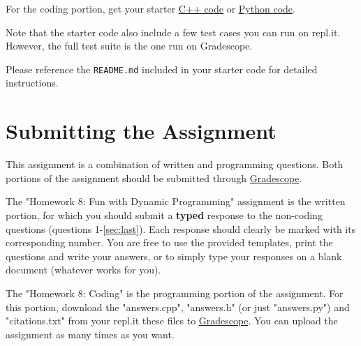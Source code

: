 \documentclass [12pt]{article}
\begin{document}
For the coding portion, get your starter \href{https://replit.com/team/COMP285/HW8-Code}{C++ code} or \href{https://replit.com/team/COMP285/HW8-Code-Python}{Python code}.

Note that the starter code also include a few test cases you can run on repl.it. However, the full test suite is the one run on Gradescope.

Please reference the \texttt{README.md} included in your starter code for detailed instructions.

\section*{Submitting the Assignment}

This assignment is a combination of written and programming questions. Both portions of the assignment should be submitted through \href{https://www.gradescope.com/courses/350304}{Gradescope}.

The "Homework 8: Fun with Dynamic Programming" assignment is the written portion, for which you should submit a \textbf{typed} response to the non-coding questions (questions 1-\ref{sec:last}). Each response should clearly be marked with its corresponding number. You are free to use the provided templates, print the questions and write your answers, or to simply type your responses on a blank document (whatever works for you).

The "Homework 8: Coding" is the programming portion of the assignment. For this portion, download the "answers.cpp", "answers.h" (or just "answers.py") and "citations.txt" from your repl.it these files to \href{https://www.gradescope.com/courses/350304}{Gradescope}. You can upload the assignment as many times as you want.
\end{document}
